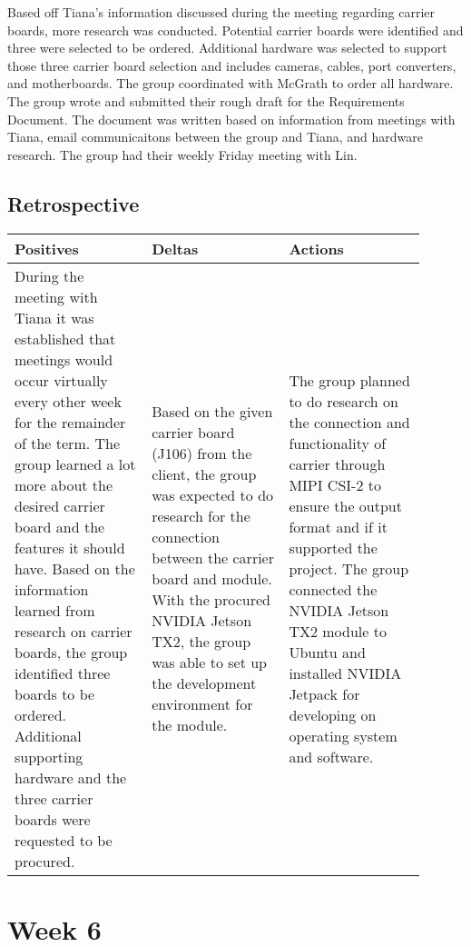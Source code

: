 \documentclass[letterpaper,10pt,serif,draftclsnofoot,onecolumn,compsoc,titlepage]{IEEEtran}
\begin{document}
Based off Tiana's information discussed during the meeting regarding carrier boards,
more research was conducted. Potential carrier boards were identified and three 
were selected to be ordered. Additional hardware was selected to support those three 
carrier board selection and includes cameras, cables, port converters, and 
motherboards. The group coordinated with McGrath to order all 
hardware. \\

The group wrote and submitted their rough draft for the Requirements Document. The 
document was written based on information from meetings with Tiana, email 
communicaitons between the group and Tiana, and hardware research.  The group had 
their weekly Friday meeting with Lin. \\

\subsection{Retrospective}

\begin{tabular}{|p{0.3\linewidth}|p{0.3\linewidth}|p{0.3\linewidth}|}
   \hline
   \textbf{Positives} & \textbf{Deltas} & \textbf{Actions}\\ 
   \hline
   During the meeting with Tiana it was established that meetings would occur virtually 
   every other week for the remainder of the term. The group learned a lot more about 
   the desired carrier board and the features it should have. Based on the information 
   learned from research on carrier boards, the group identified three boards to be ordered. Additional 
   supporting hardware and the three carrier boards were requested to be 
   procured.  
   & 
   Based on the given carrier board (J106) from the client, the group was expected to do 
   research for the connection between the carrier board and module. 
   With the procured NVIDIA Jetson TX2, the group was able to set up the development 
   environment for the module. 
   & 
   The group planned to do research on the connection and functionality of carrier through 
   MIPI CSI-2 to ensure the output format and if it supported the project. 
   The group connected the NVIDIA Jetson TX2 module to Ubuntu and installed NVIDIA Jetpack 
   for developing on operating system and software.  \\
   \hline
\end{tabular}

\section{Week 6}
\end{document}
